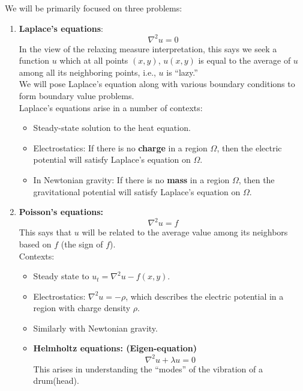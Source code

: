 \documentclass{article}
\theoremstyle{definition}
\begin{document}

We will be primarily focused on three problems:
\begin{enumerate}
	\item \textbf{Laplace's equations}: $$\boxed{\nabla^2 u = 0}$$ In the view of the relaxing measure interpretation, this says we seek a function $u$ which at all points $(x,y)$, $u(x,y)$ is equal to the average of $u$ among all its neighboring points, i.e., $u$ is ``lazy.''\\
	
	We will pose Laplace's equation along with various boundary conditions to form boundary value problems.\\
	
	Laplace's equations arise in a number of contexts:
	\begin{itemize}
		\item Steady-state solution to the heat equation.
		\item Electrostatics: If there is no \textbf{charge} in a region $\Omega$, then the electric potential will satisfy Laplace's equation on $\Omega$.
		\item In Newtonian gravity: If there is no \textbf{mass} in a region $\Omega$, then the gravitational potential will satisfy Laplace's equation on $\Omega$.
	\end{itemize}
	\item \textbf{Poisson's equations:} $$\boxed{ \nabla^2 u = f }$$ This says that $u$ will be related to the average value among its neighbors based on $f$ (the sign of $f$).\\
	
	Contexts:
	\begin{itemize}
		\item Steady state to $u_t = \nabla^2 u - f(x,y)$.
		\item Electrostatics: $\nabla^2 u = -\rho$, which describes the electric potential in a region with charge density $\rho$. 
		\item Similarly with Newtonian gravity.
		
	\item \textbf{Helmholtz equations: (Eigen-equation)}
	$$ \nabla^2 u + \lambda u = 0 $$
	This arises in understanding the ``modes'' of the vibration of a drum(head).
	\end{itemize}
\end{enumerate}
\end{document}
